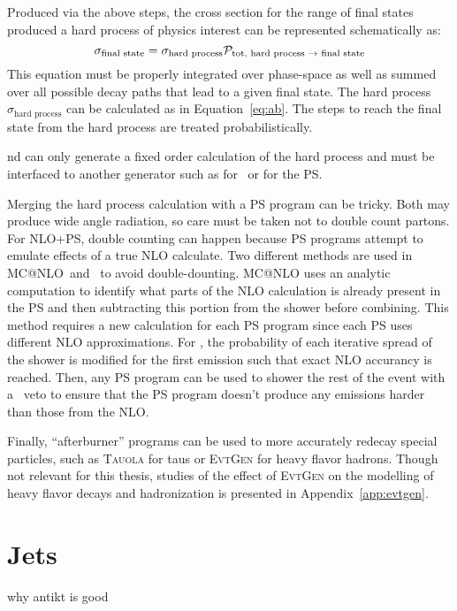 Produced via the above steps, the cross section for the range of final states produced a hard process of physics interest can be represented schematically as:
\begin{equation}
\sigma_{\text{final state}}=\sigma_{\text{hard process}} \mathcal{P}_{\text{tot, hard process \rarrow final state}}
\label{eq:finalst}
\end{equation}
This equation must be properly integrated over phase-space as well as summed over all possible decay paths that lead to a given final state. The hard process $\sigma_{\text{hard process}}$ can be calculated as in Equation~\ref{eq:ab}. The steps to reach the final state from the hard process are treated probabilistically.

nd \pow \cite{Powheg,Powheg2,Powheg3,Powheg4} can only generate a fixed order calculation of the hard process and must be interfaced to another generator such as for \py\ or \hw for the PS. 

Merging the hard process calculation with a PS program can be tricky. Both may produce wide angle radiation, so care must be taken not to double count partons. For NLO+PS, double counting can happen because PS programs attempt to emulate effects of a true NLO calculate. Two different methods are used in \textsc{MC@NLO}\ and \pow\ to avoid double-dounting. \textsc{MC@NLO} uses an analytic computation to identify what parts of the NLO calculation is already present in the PS and then subtracting this portion from the shower before combining. This method requires a new calculation for each PS program since each PS uses different NLO approximations. For \pow, the probability of each iterative spread of the shower is modified for the first emission such that exact NLO accurancy is reached. Then, any PS program can be used to shower the rest of the event with a \pt\ veto to ensure that the PS program doesn't produce any emissions harder than those from the NLO.

Finally, ``afterburner'' programs can be used to more accurately redecay special particles, such as \textsc{Tauola} for taus\cite{Jadach:1993hs} or \textsc{EvtGen} for heavy flavor hadrons\cite{Lange:2001uf}. Though not relevant for this thesis, studies of the effect of \textsc{EvtGen} on the modelling of heavy flavor decays and hadronization is presented in Appendix~\ref{app:evtgen}.
\section{Jets}
why antikt is good
